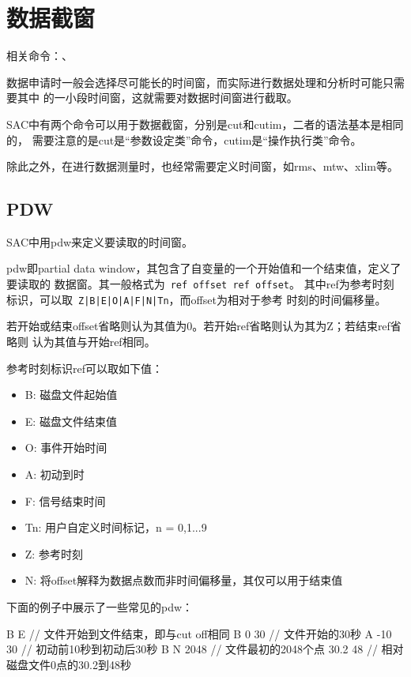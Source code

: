 \section{数据截窗}

相关命令：、

数据申请时一般会选择尽可能长的时间窗，而实际进行数据处理和分析时可能只需要其中
的一小段时间窗，这就需要对数据时间窗进行截取。

SAC中有两个命令可以用于数据截窗，分别是cut和cutim，二者的语法基本是相同的，
需要注意的是cut是``参数设定类''命令，cutim是``操作执行类''命令。

除此之外，在进行数据测量时，也经常需要定义时间窗，如rms、mtw、xlim等。

\subsection{PDW}
\label{subsec:pdw}
SAC中用pdw来定义要读取的时间窗。

pdw即partial data window，其包含了自变量的一个开始值和一个结束值，定义了要读取的
数据窗。其一般格式为~\lstinline{ref offset ref offset}。
其中ref为参考时刻标识，可以取~\lstinline{Z|B|E|O|A|F|N|Tn}，而offset为相对于参考
时刻的时间偏移量。

若开始或结束offset省略则认为其值为0。若开始ref省略则认为其为Z；若结束ref省略则
认为其值与开始ref相同。

参考时刻标识ref可以取如下值：
\begin{itemize}
\item B: 磁盘文件起始值
\item E: 磁盘文件结束值
\item O: 事件开始时间
\item A: 初动到时
\item F: 信号结束时间
\item Tn: 用户自定义时间标记，n = 0,1...9
\item Z: 参考时刻
\item N: 将offset解释为数据点数而非时间偏移量，其仅可以用于结束值
\end{itemize}

下面的例子中展示了一些常见的pdw：
\begin{SACCode}
 B E        // 文件开始到文件结束，即与cut off相同
 B 0 30     // 文件开始的30秒
 A -10 30   // 初动前10秒到初动后30秒
 B N 2048   // 文件最初的2048个点
 30.2 48    // 相对磁盘文件0点的30.2到48秒
\end{SACCode}
